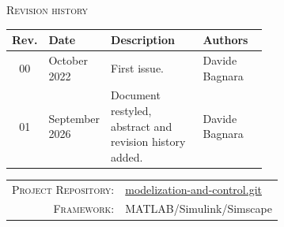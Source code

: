 \documentclass[12pt,a4paper]{scrartcl}
\newcommand{\DocAuthor}{Davide Bagnara}
\newcommand{\MetaLabelA}{Project Repository}
\newcommand{\MetaValueAUrl}{https://github.com/pwr-control/modelization-and-control.git}
\newcommand{\MetaValueALabel}{modelization-and-control.git}
\newcommand{\MetaLabelB}{Framework}
\newcommand{\MetaValueB}{MATLAB/Simulink/Simscape}
\begin{document}
	\vfill

	\begin{center}
		\begin{minipage}{0.96\linewidth}
			\centering
			{\footnotesize\scshape Revision history}\\[6pt]
			{\footnotesize
				\begin{tabular}{@{}cl>{\raggedright\arraybackslash}p{0.38\linewidth}>{\raggedright\arraybackslash}p{0.26\linewidth}@{}}
					\toprule
					\textbf{Rev.} & \textbf{Date} & \textbf{Description} & \textbf{Authors} \\
					\midrule
					00 & October 2022   & First issue.                                              & \DocAuthor \\
					01 & September 2026 & Document restyled, abstract and revision history added.   & \DocAuthor \\
					\bottomrule
				\end{tabular}}
		\end{minipage}
	\end{center}

	\vspace{18pt}

	\noindent
	\begin{tabular}{@{} r @{\quad} l @{}}
		\textsc{\MetaLabelA:} & {\href{\MetaValueAUrl}{\MetaValueALabel}} \\[3pt]
		\textsc{\MetaLabelB:} & {\MetaValueB}       \\[3pt]
	\end{tabular}

	\newpage
	\setcounter{page}{1}
	\tableofcontents
	\listoffigures
	\listoftables
	\newpage
\end{document}
